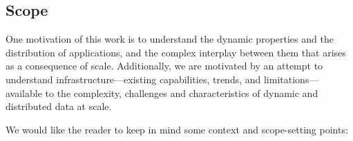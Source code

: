 



\subsection{Scope}




One motivation of this work is to understand the dynamic properties
and the distribution of applications, and the complex interplay
between them that arises as a consequence of scale.  Additionally, we
are motivated by an attempt to understand infrastructure---existing
capabilities, trends, and limitations---available to the complexity,
challenges and characteristics of dynamic and distributed data at
scale.

We would like the reader to keep in mind some context and scope-setting points:


